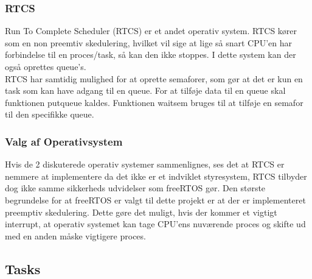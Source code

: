 \subsubsection{RTCS}

Run To Complete Scheduler (RTCS) er et andet operativ system. RTCS kører som en non preemtiv skedulering, hvilket vil sige at lige så snart CPU'en har forbindelse til en proces/task, så kan den ikke stoppes. I dette system kan der også oprettes queue's.
\\
RTCS har samtidig mulighed for at oprette semaforer, som gør at det er kun en task som kan have adgang til en queue. For at tilføje data til en queue skal funktionen put\textunderscore queue kaldes. Funktionen wait\textunderscore sem bruges til at tilføje en semafor til den specifikke queue.

\subsubsection{Valg af Operativsystem}

Hvis de 2 diskuterede operativ systemer sammenlignes, ses det at RTCS er nemmere at implementere da det ikke er et indviklet styresystem, RTCS tilbyder dog ikke samme sikkerheds udvidelser som freeRTOS gør. Den største begrundelse for at freeRTOS er valgt til dette projekt er at der er implementeret preemptiv skedulering. Dette gøre det muligt, hvis der kommer et vigtigt interrupt, at operativ systemet kan tage CPU'ens nuværende proces og skifte ud med en anden måske vigtigere proces.

\subsection{Tasks}


